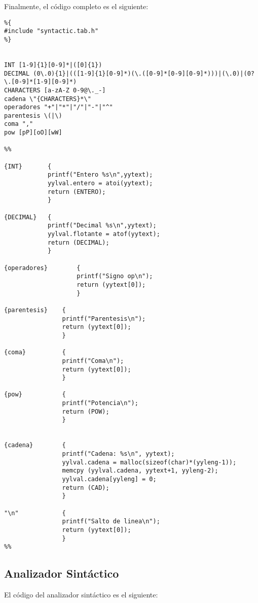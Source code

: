 \pagebreak

Finalmente, el código completo es el siguiente:

\begin{lstlisting}
%{
#include "syntactic.tab.h"
%}


INT [1-9]{1}[0-9]*|([0]{1})
DECIMAL (0\.0){1}|(([1-9]{1}[0-9]*)(\.([0-9]*[0-9][0-9]*)))|(\.0)|(0?\.[0-9]*[1-9][0-9]*)
CHARACTERS [a-zA-Z 0-9@\._-]	
cadena \"{CHARACTERS}*\"
operadores "+"|"*"|"/"|"-"|"^"
parentesis \(|\)
coma ","
pow [pP][oO][wW]

%%

{INT} 		{
			printf("Entero %s\n",yytext);
			yylval.entero = atoi(yytext);
            return (ENTERO);
			}

{DECIMAL} 	{
			printf("Decimal %s\n",yytext);
			yylval.flotante = atof(yytext);
            return (DECIMAL);
        	}

{operadores}	 	{
					printf("Signo op\n");
                	return (yytext[0]);
                	}

{parentesis}	{
				printf("Parentesis\n");
				return (yytext[0]);
				}

{coma}			{
				printf("Coma\n");
				return (yytext[0]);
				}

{pow}			{
				printf("Potencia\n");
				return (POW);
				}


{cadena}		{
				printf("Cadena: %s\n", yytext);
				yylval.cadena = malloc(sizeof(char)*(yyleng-1)); 
    			memcpy (yylval.cadena, yytext+1, yyleng-2);
    			yylval.cadena[yyleng] = 0;                
				return (CAD);
				}

"\n"            {
				printf("Salto de linea\n");
                return (yytext[0]);
                }
%%
\end{lstlisting}

\subsection{Analizador Sintáctico}

El código del analizador sintáctico es el siguiente:

